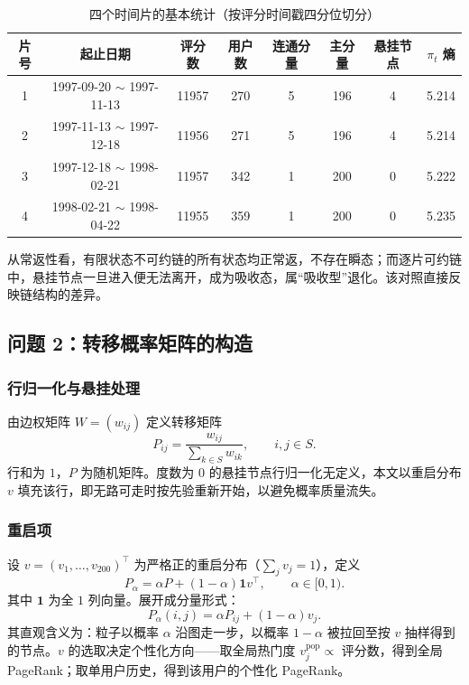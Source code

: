 \documentclass[12pt,a4paper]{ctexart}
\begin{document}
\begin{table}[H]
\centering
\caption{四个时间片的基本统计（按评分时间戳四分位切分）}
\label{tab:slices}
\small
\begin{tabular}{cccccccc}
\toprule
片号 & 起止日期 & 评分数 & 用户数 & 连通分量 & 主分量 & 悬挂节点 & $\pi_t$ 熵 \\
\midrule
1 & 1997-09-20 $\sim$ 1997-11-13 & 11957 & 270 & 5 & 196 & 4 & 5.214 \\
2 & 1997-11-13 $\sim$ 1997-12-18 & 11956 & 271 & 5 & 196 & 4 & 5.214 \\
3 & 1997-12-18 $\sim$ 1998-02-21 & 11957 & 342 & 1 & 200 & 0 & 5.222 \\
4 & 1998-02-21 $\sim$ 1998-04-22 & 11955 & 359 & 1 & 200 & 0 & 5.235 \\
\bottomrule
\end{tabular}
\end{table}

从常返性看，有限状态不可约链的所有状态均正常返，不存在瞬态；而逐片可约链中，悬挂节点一旦进入便无法离开，成为吸收态，属“吸收型”退化。该对照直接反映链结构的差异。

\subsection{问题 2：转移概率矩阵的构造}

\subsubsection{行归一化与悬挂处理}

由边权矩阵 $W=(w_{ij})$ 定义转移矩阵
\begin{equation}
P_{ij}=\frac{w_{ij}}{\sum_{k\in S}w_{ik}},\qquad i,j\in S .
\label{eq:P}
\end{equation}
行和为 $1$，$P$ 为随机矩阵。度数为 $0$ 的悬挂节点行归一化无定义，本文以重启分布 $v$ 填充该行，即无路可走时按先验重新开始，以避免概率质量流失。

\subsubsection{重启项}

设 $v=(v_1,\dots,v_{200})^{\top}$ 为严格正的重启分布（$\sum_j v_j=1$），定义
\begin{equation}
P_{\alpha}=\alpha P+(1-\alpha)\mathbf{1}v^{\top},\qquad \alpha\in[0,1).
\label{eq:Palpha}
\end{equation}
其中 $\mathbf{1}$ 为全 $1$ 列向量。展开成分量形式：
\begin{equation}
P_{\alpha}(i,j)=\alpha P_{ij}+(1-\alpha)v_j .
\label{eq:Palpha-ij}
\end{equation}
其直观含义为：粒子以概率 $\alpha$ 沿图走一步，以概率 $1-\alpha$ 被拉回至按 $v$ 抽样得到的节点。$v$ 的选取决定个性化方向——取全局热门度 $v^{\mathrm{pop}}_j\propto$ 评分数，得到全局 PageRank；取单用户历史，得到该用户的个性化 PageRank。
\end{document}

